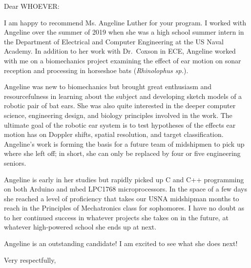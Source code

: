\documentclass[12pt]{wrceletter}
\date{\today}
\begin{document}
\begin{letter}{%
}

\opening{Dear WHOEVER:}
\raggedright %
\setlength{\parindent}{15pt} %


I am happy to recommend Ms. Angeline Luther for your program. I worked with Angeline over the summer of 2019 when she was a high school summer intern in the Department of Electrical and Computer Engineering at the US Naval Academy. In addition to her work with Dr.~Coxson in ECE, Angeline worked with me on a biomechanics project examining the effect of ear motion on sonar reception and processing in horseshoe bats (\emph{Rhinolophus sp.}). 

Angeline was new to biomechanics but brought great enthusiasm and resourcefulness in learning about the subject and developing sketch models of a robotic pair of bat ears. She was also quite interested in the deeper computer science, engineering design, and biology principles involved in the work. The ultimate goal of the robotic ear system is to test hypotheses of the effects ear motion has on Doppler shifts, spatial resolution, and target classification. Angeline's work is forming the basis for a future team of midshipmen to pick up where she left off; in short, she can only be replaced by four or five engineering seniors. 

Angeline is early in her studies but rapidly picked up C and C++ programming on both Arduino and mbed LPC1768 microprocessors. In the space of a few days she reached a level of proficiency that takes our USNA midshipman months to reach in the Principles of Mechatronics class for sophomores. I have no doubt as to her continued success in whatever projects she takes on in the future, at whatever high-powered school she ends up at next. 

Angeline is an outstanding candidate! I am excited to see what she does next!



\closing{Very respectfully,} %

\end{letter}
\end{document}
